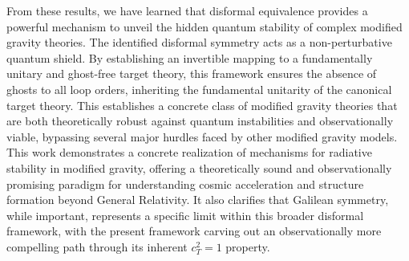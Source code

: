 \documentclass[twocolumn]{aastex631}
\begin{document}
From these results, we have learned that disformal equivalence provides a powerful mechanism to unveil the hidden quantum stability of complex modified gravity theories. The identified disformal symmetry acts as a non-perturbative quantum shield. By establishing an invertible mapping to a fundamentally unitary and ghost-free target theory, this framework ensures the absence of ghosts to all loop orders, inheriting the fundamental unitarity of the canonical target theory. This establishes a concrete class of modified gravity theories that are both theoretically robust against quantum instabilities and observationally viable, bypassing several major hurdles faced by other modified gravity models. This work demonstrates a concrete realization of mechanisms for radiative stability in modified gravity, offering a theoretically sound and observationally promising paradigm for understanding cosmic acceleration and structure formation beyond General Relativity. It also clarifies that Galilean symmetry, while important, represents a specific limit within this broader disformal framework, with the present framework carving out an observationally more compelling path through its inherent $c_T^2=1$ property.

{}

\end{document}

